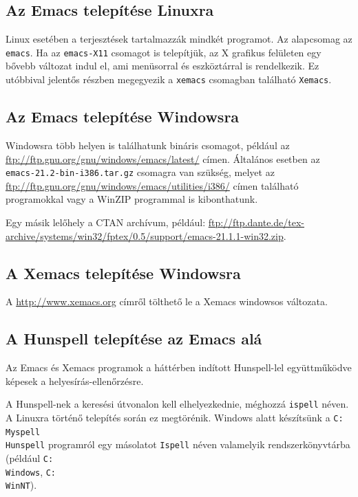 \subsection{Az Emacs telepítése Linuxra}

Linux esetében a terjesztések tartalmazzák mindkét programot.
Az alapcsomag az \texttt{emacs}. Ha az \texttt{emacs-X11}
csomagot is telepítjük, az X grafikus felületen egy bővebb
változat indul el, ami menüsorral és eszköztárral is rendelkezik.
Ez utóbbival jelentős részben megegyezik a \texttt{xemacs} csomagban található
\texttt{Xemacs}.

\subsection{Az Emacs telepítése Windowsra}

Windowsra több helyen is találhatunk bináris csomagot, például az
\url{ftp://ftp.gnu.org/gnu/windows/emacs/latest/} címen.
Általános esetben az \texttt{emacs-21.2-bin-i386.tar.gz} csomagra van
szükség, melyet az
\url{ftp://ftp.gnu.org/gnu/windows/emacs/utilities/i386/} címen
található programokkal  vagy a WinZIP programmal is kibonthatunk.

Egy másik lelőhely a CTAN archívum, például:
\url{ftp://ftp.dante.de/tex-archive/systems/win32/fptex/0.5/support/emacs-21.1.1-win32.zip}.

\subsection{A Xemacs telepítése Windowsra}

A \url{http://www.xemacs.org} címről tölthető le a Xemacs
windowsos változata.

\subsection{A Hunspell telepítése az Emacs alá}

Az Emacs és Xemacs programok a háttérben indított Hunspell-lel
együttműködve képesek a helyesírás-ellenőrzésre.

A Hunspell-nek a keresési útvonalon kell elhelyezkednie, méghozzá \texttt{ispell}
néven. A Linuxra történő telepítés során ez megtörénik.
Windows alatt készítsünk a \texttt{C:\\Myspell\\Hunspell} programról
egy másolatot \texttt{Ispell} néven valamelyik rendszerkönyvtárba
(például \texttt{C:\\Windows}, \texttt{C:\\WinNT}).


